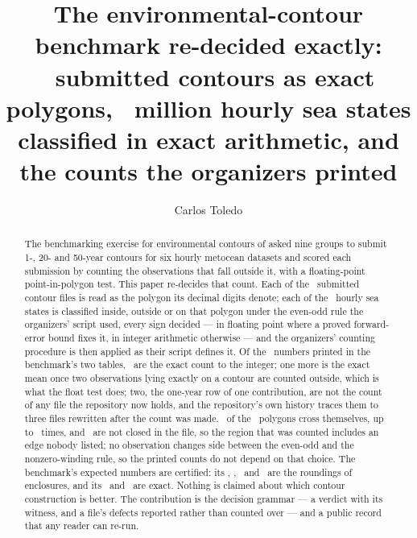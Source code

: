 \documentclass[preprint,11pt,authoryear]{elsarticle}
\begin{document}
\begin{frontmatter}

\title{The environmental-contour benchmark re-decided exactly: \EContours\ submitted contours as exact polygons, \EHoursTotalMillions\ million hourly sea states classified in exact arithmetic, and the counts the organizers printed}

\author[a]{Carlos Toledo}

\begin{abstract}
The benchmarking exercise for environmental contours of \citet{haselsteiner2021} asked nine groups to submit 1-, 20- and 50-year contours for six hourly metocean datasets and scored each submission by counting the observations that fall outside it, with a floating-point point-in-polygon test. This paper re-decides that count. Each of the \EContours\ submitted contour files is read as the polygon its decimal digits denote; each of the \EHoursTotal\ hourly sea states is classified inside, outside or on that polygon under the even-odd rule the organizers' script used, every sign decided --- in floating point where a proved forward-error bound fixes it, in integer arithmetic otherwise --- and the organizers' counting procedure is then applied as their script defines it. Of the \EComparisons\ numbers printed in the benchmark's two tables, \EExact\ are the exact count to the integer; one more is the exact mean once two observations lying exactly on a contour are counted outside, which is what the float test does; two, the one-year row of one contribution, are not the count of any file the repository now holds, and the repository's own history traces them to three files rewritten after the count was made. \ENotSimple\ of the \EContours\ polygons cross themselves, up to \EMaxCross\ times, and \ENotClosed\ are not closed in the file, so the region that was counted includes an edge nobody listed; no observation changes side between the even-odd and the nonzero-winding rule, so the printed counts do not depend on that choice. The benchmark's expected numbers are certified: its \EPrintedIformOne, \EPrintedIformTwenty, \EPrintedIformDOne\ and \EPrintedIformDFifty\ are the roundings of enclosures, and its \EPrintedTotalOne\ and \EPrintedTotalTwenty\ are exact. Nothing is claimed about which contour construction is better. The contribution is the decision grammar --- a verdict with its witness, and a file's defects reported rather than counted over --- and a public record that any reader can re-run.
\end{abstract}


\end{frontmatter}
\end{document}
